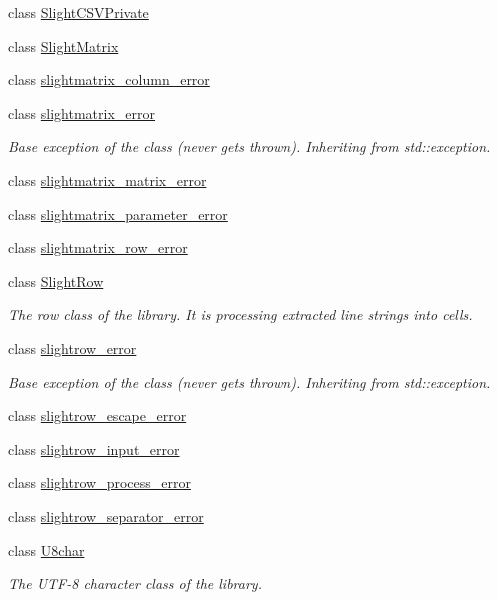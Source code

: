 \begin{DoxyCompactItemize}
\item 
class \hyperlink{classutils_1_1SlightCSVPrivate}{Slight\+C\+S\+V\+Private}
\item 
class \hyperlink{classutils_1_1SlightMatrix}{Slight\+Matrix}
\item 
class \hyperlink{classutils_1_1slightmatrix__column__error}{slightmatrix\+\_\+column\+\_\+error}
\item 
class \hyperlink{classutils_1_1slightmatrix__error}{slightmatrix\+\_\+error}
\begin{DoxyCompactList}\small\item\em Base exception of the class (never gets thrown). Inheriting from std\+::exception. \end{DoxyCompactList}\item 
class \hyperlink{classutils_1_1slightmatrix__matrix__error}{slightmatrix\+\_\+matrix\+\_\+error}
\item 
class \hyperlink{classutils_1_1slightmatrix__parameter__error}{slightmatrix\+\_\+parameter\+\_\+error}
\item 
class \hyperlink{classutils_1_1slightmatrix__row__error}{slightmatrix\+\_\+row\+\_\+error}
\item 
class \hyperlink{classutils_1_1SlightRow}{Slight\+Row}
\begin{DoxyCompactList}\small\item\em The row class of the library. It is processing extracted line strings into cells. \end{DoxyCompactList}\item 
class \hyperlink{classutils_1_1slightrow__error}{slightrow\+\_\+error}
\begin{DoxyCompactList}\small\item\em Base exception of the class (never gets thrown). Inheriting from std\+::exception. \end{DoxyCompactList}\item 
class \hyperlink{classutils_1_1slightrow__escape__error}{slightrow\+\_\+escape\+\_\+error}
\item 
class \hyperlink{classutils_1_1slightrow__input__error}{slightrow\+\_\+input\+\_\+error}
\item 
class \hyperlink{classutils_1_1slightrow__process__error}{slightrow\+\_\+process\+\_\+error}
\item 
class \hyperlink{classutils_1_1slightrow__separator__error}{slightrow\+\_\+separator\+\_\+error}
\item 
class \hyperlink{classutils_1_1U8char}{U8char}
\begin{DoxyCompactList}\small\item\em The U\+T\+F-\/8 character class of the library. \end{DoxyCompactList}\item 

\end{DoxyCompactItemize}
